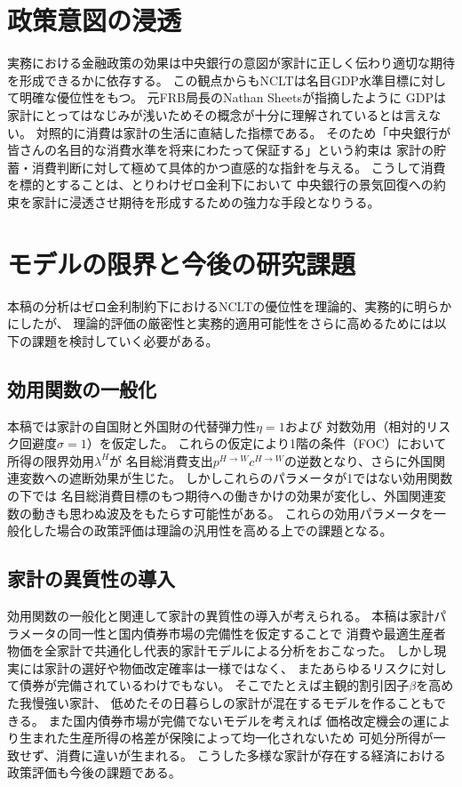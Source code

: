 \section{政策意図の浸透}
\label{sec:discussion_communication}
実務における金融政策の効果は中央銀行の意図が家計に正しく伝わり適切な期待を形成できるかに依存する。
この観点からもNCLTは名目GDP水準目標に対して明確な優位性をもつ。
元FRB局長のNathan Sheetsが指摘したように
GDPは家計にとってはなじみが浅いためその概念が十分に理解されているとは言えない。
対照的に消費は家計の生活に直結した指標である。
そのため「中央銀行が皆さんの名目的な消費水準を将来にわたって保証する」という約束は
家計の貯蓄・消費判断に対して極めて具体的かつ直感的な指針を与える。
こうして消費を標的とすることは、とりわけゼロ金利下において
中央銀行の景気回復への約束を家計に浸透させ期待を形成するための強力な手段となりうる。

\section{モデルの限界と今後の研究課題}
\label{sec:discussion_limitations}
本稿の分析はゼロ金利制約下におけるNCLTの優位性を理論的、実務的に明らかにしたが、
理論的評価の厳密性と実務的適用可能性をさらに高めるためには以下の課題を検討していく必要がある。

\subsection{効用関数の一般化}
\label{sec:discussion_limitations_utility}
本稿では家計の自国財と外国財の代替弾力性\(\eta=1\)および
対数効用（相対的リスク回避度\(\sigma=1\)）を仮定した。
これらの仮定により1階の条件（FOC）において所得の限界効用\(\lambda^H\)が
名目総消費支出\(p^{H\to W}c^{H\to W}\)の逆数となり、さらに外国関連変数への遮断効果が生じた。
しかしこれらのパラメータが1ではない効用関数の下では
名目総消費目標のもつ期待への働きかけの効果が変化し、外国関連変数の動きも思わぬ波及をもたらす可能性がある。
これらの効用パラメータを一般化した場合の政策評価は理論の汎用性を高める上での課題となる。

\subsection{家計の異質性の導入}
\label{sec:discussion_limitations_heterogeneity}
効用関数の一般化と関連して家計の異質性の導入が考えられる。
本稿は家計パラメータの同一性と国内債券市場の完備性を仮定することで
消費や最適生産者物価を全家計で共通化し代表的家計モデルによる分析をおこなった。
しかし現実には家計の選好や物価改定確率は一様ではなく、
またあらゆるリスクに対して債券が完備されているわけでもない。
そこでたとえば主観的割引因子\(\beta\)を高めた我慢強い家計、
低めたその日暮らしの家計が混在するモデルを作ることもできる。
また国内債券市場が完備でないモデルを考えれば
価格改定機会の運により生まれた生産所得の格差が保険によって均一化されないため
可処分所得が一致せず、消費に違いが生まれる。
こうした多様な家計が存在する経済における政策評価も今後の課題である。

